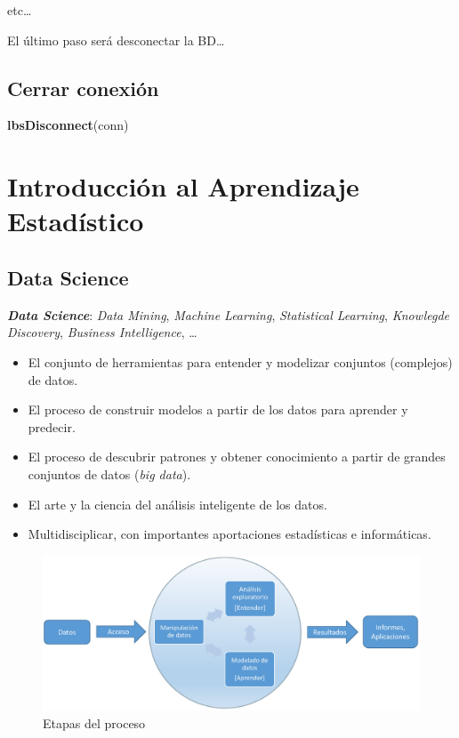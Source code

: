 \documentclass[]{book}
\newenvironment{Shaded}{\begin{snugshade}}{\end{snugshade}}
\newcommand{\KeywordTok}[1]{\textcolor[rgb]{0.13,0.29,0.53}{\textbf{#1}}}
\newcommand{\NormalTok}[1]{#1}
\begin{document}
etc\ldots{}

El último paso será desconectar la BD\ldots{}

\section{Cerrar conexión}\label{cerrar-conexion}

\begin{Shaded}
\begin{Highlighting}[]
\KeywordTok{lbsDisconnect}\NormalTok{(conn)}
\end{Highlighting}
\end{Shaded}

\chapter{Introducción al Aprendizaje
Estadístico}\label{introduccion-al-aprendizaje-estadistico}

\section{Data Science}\label{data-science}

\textbf{\emph{Data Science}}: \emph{Data Mining}, \emph{Machine
Learning}, \emph{Statistical Learning}, \emph{Knowlegde Discovery},
\emph{Business Intelligence}, \ldots{}

\begin{itemize}
\item
  El conjunto de herramientas para entender y modelizar conjuntos
  (complejos) de datos.
\item
  El proceso de construir modelos a partir de los datos para aprender y
  predecir.
\item
  El proceso de descubrir patrones y obtener conocimiento a partir de
  grandes conjuntos de datos (\emph{big data}).
\item
  El arte y la ciencia del análisis inteligente de los datos.
\item
  Multidisciplicar, con importantes aportaciones estadísticas e
  informáticas.
\end{itemize}

\begin{figure}
\includegraphics[width=0.8\linewidth]{images/esquema2} \caption{Etapas del proceso}\label{fig:esquema}
\end{figure}
\end{document}
